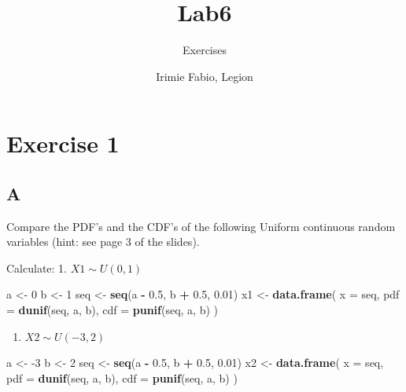 \documentclass[
]{article}
\title{Lab6}
\subtitle{Exercises}
\author{Irimie Fabio, Legion}
\date{}
\newenvironment{Shaded}{\begin{snugshade}}{\end{snugshade}}
\newcommand{\DataTypeTok}[1]{\textcolor[rgb]{0.13,0.29,0.53}{#1}}
\newcommand{\DecValTok}[1]{\textcolor[rgb]{0.00,0.00,0.81}{#1}}
\newcommand{\FloatTok}[1]{\textcolor[rgb]{0.00,0.00,0.81}{#1}}
\newcommand{\KeywordTok}[1]{\textcolor[rgb]{0.13,0.29,0.53}{\textbf{#1}}}
\newcommand{\NormalTok}[1]{#1}
\newcommand{\OperatorTok}[1]{\textcolor[rgb]{0.81,0.36,0.00}{\textbf{#1}}}
\newcommand{\StringTok}[1]{\textcolor[rgb]{0.31,0.60,0.02}{#1}}
\providecommand{\tightlist}{%
  \setlength{\itemsep}{0pt}\setlength{\parskip}{0pt}}
\begin{document}
\maketitle

{
\setcounter{tocdepth}{2}
\tableofcontents
}
\hypertarget{exercise-1}{%
\section{Exercise 1}\label{exercise-1}}

\hypertarget{a}{%
\subsection{A}\label{a}}

Compare the PDF's and the CDF's of the following Uniform continuous
random variables (hint: see page 3 of the slides).

Calculate: 1. \(X1 \sim U(0,1)\)

\begin{Shaded}
\begin{Highlighting}[]
\NormalTok{a \textless{}{-}}\StringTok{ }\DecValTok{0}
\NormalTok{b \textless{}{-}}\StringTok{ }\DecValTok{1}
\NormalTok{seq \textless{}{-}}\StringTok{ }\KeywordTok{seq}\NormalTok{(a }\OperatorTok{{-}}\StringTok{ }\FloatTok{0.5}\NormalTok{, b }\OperatorTok{+}\StringTok{ }\FloatTok{0.5}\NormalTok{, }\FloatTok{0.01}\NormalTok{)}
\NormalTok{x1 \textless{}{-}}\StringTok{ }\KeywordTok{data.frame}\NormalTok{(}
  \DataTypeTok{x =}\NormalTok{ seq,}
  \DataTypeTok{pdf =} \KeywordTok{dunif}\NormalTok{(seq, a, b),}
  \DataTypeTok{cdf =} \KeywordTok{punif}\NormalTok{(seq, a, b)}
\NormalTok{)}
\end{Highlighting}
\end{Shaded}

\begin{enumerate}
\def\labelenumi{\arabic{enumi}.}
\setcounter{enumi}{1}
\tightlist
\item
  \(X2 \sim U(-3,2)\)
\end{enumerate}

\begin{Shaded}
\begin{Highlighting}[]
\NormalTok{a \textless{}{-}}\StringTok{ }\DecValTok{{-}3}
\NormalTok{b \textless{}{-}}\StringTok{ }\DecValTok{2}
\NormalTok{seq \textless{}{-}}\StringTok{ }\KeywordTok{seq}\NormalTok{(a }\OperatorTok{{-}}\StringTok{ }\FloatTok{0.5}\NormalTok{, b }\OperatorTok{+}\StringTok{ }\FloatTok{0.5}\NormalTok{, }\FloatTok{0.01}\NormalTok{)}
\NormalTok{x2 \textless{}{-}}\StringTok{ }\KeywordTok{data.frame}\NormalTok{(}
  \DataTypeTok{x =}\NormalTok{ seq,}
  \DataTypeTok{pdf =} \KeywordTok{dunif}\NormalTok{(seq, a, b),}
  \DataTypeTok{cdf =} \KeywordTok{punif}\NormalTok{(seq, a, b)}
\NormalTok{)}
\end{Highlighting}
\end{Shaded}
\end{document}
